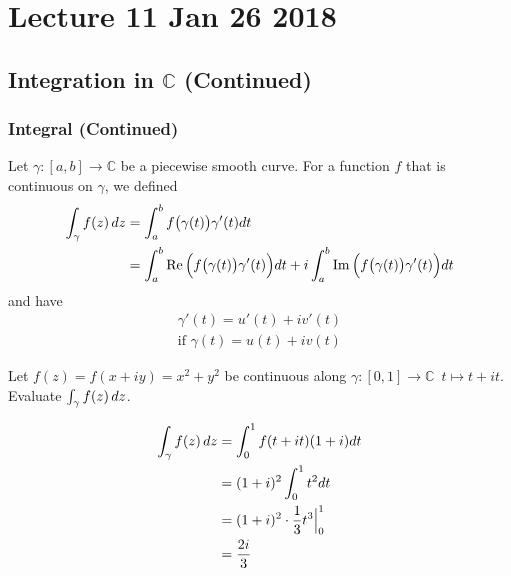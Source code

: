 \documentclass[11pt, oneside]{book}
\begin{document}



\chapter{Lecture 11 Jan 26 2018}
	\label{chapter:lecture_11_jan_26_2018}

\section{Integration in \texorpdfstring{$\mathbb{C}$}{C} (Continued)} %
\label{sec:integration_in_c_continued}

\subsection{Integral (Continued)} %
\label{sub:integral_continued}

\begin{note}[Recall]
	Let $\gamma: [a, b] \to \mathbb{C}$ be a piecewise smooth curve. For a function $f$ that is continuous on $\gamma$, we defined
	\begin{align*}
		\int_{\gamma} f(z) \mathop{}\!d{z}
			&= \int_{a}^{b} f\big( \gamma(t) \big) \gamma'(t) dt \\
			&= \int_{a}^{b} \operatorname{Re}\Big(f\big( \gamma(t) \big) \gamma'(t) \Big) dt + i \int_{a}^{b} \operatorname{Im}\Big(f\big( \gamma(t) \big) \gamma'(t) \Big) dt
	\end{align*}
	and have
	\begin{gather*}
		\gamma'(t) = u'(t) + iv'(t) \\
		\text{if } \gamma(t) = u(t) + iv(t)
	\end{gather*}
\end{note}

\begin{eg}
	Let $f(z) = f(x + iy) = x^2 + y^2$ be continuous along $\gamma : [0, 1] \to \mathbb{C} \enspace t \mapsto t + it$. Evaluate $\int_{\gamma} f(z) \mathop{}\!d{z}$.
	\begin{solution}
		\begin{align*}
			\int_{\gamma} f(z) \mathop{}\!d{z}
				&= \int_{0}^{1} f(t + it)(1 + i) dt \\
				&= (1 + i)^2 \int_{0}^{1} t^2 dt \\
				&= (1 + i)^2 \cdot \frac{1}{3} t^3 \Big|_{0}^{1} \\
				&= \frac{2i}{3}
		\end{align*}
	\end{solution}
\end{eg}
\end{document}
